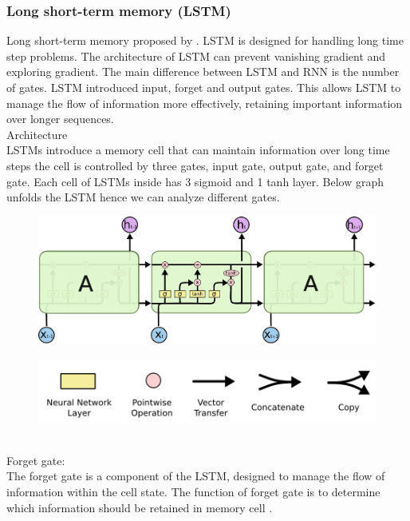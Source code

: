 \documentclass[12pt,a4paper]{article}
\begin{document}
\subsubsection{Long short-term memory (LSTM)}
Long short-term memory proposed by \parencite{hochreiter1997lstm}. LSTM is designed for handling long time step problems. The architecture of LSTM can prevent vanishing gradient and exploring gradient. The main difference between LSTM and RNN is the number of gates. LSTM introduced input, forget and output gates. This allows LSTM to manage the flow of information more effectively, retaining important information over longer sequences.
\\[2ex]
Architecture
\\[1ex]
LSTMs introduce a memory cell that can maintain information over long time steps the cell is controlled by three gates, input gate, output gate, and forget gate. Each cell of LSTMs inside has 3 sigmoid and 1 tanh layer. Below graph unfolds the LSTM hence we can analyze different gates.
\begin{figure}[!htb]
    \centering
    \includegraphics[width=1\textwidth]{../Pic/lstm1.png} %
\end{figure}
\begin{figure}[!htb]
    \centering
    \includegraphics[width=1\textwidth]{../Pic/lstm2.png} %
\end{figure}
\\
Forget gate:
\\[1ex]
The forget gate is a component of the LSTM, designed to manage the flow of information within the cell state. The function of forget gate is to determine which information should be retained in memory cell \parencite{hochreiter1997lstm}.
\end{document}
